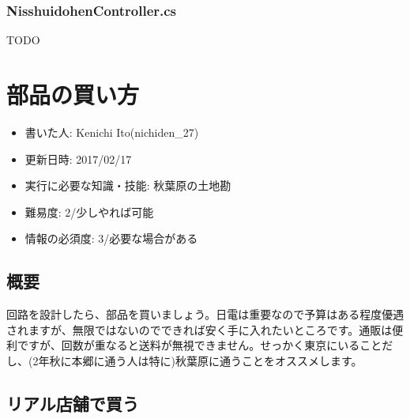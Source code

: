 \documentclass[letterpaper,10pt,dvipdfmx]{sphinxmanual}
\begin{document}
\subsection{NisshuidohenController.cs}
\label{\detokenize{nissyu-idohen/pc-software-code:nisshuidohencontroller-cs}}
TODO


\chapter{部品の買い方}
\label{\detokenize{buy_parts:}}\label{\detokenize{buy_parts::doc}}\label{\detokenize{buy_parts:id1}}\begin{itemize}
\item {} 
書いた人: Kenichi Ito(nichiden\_27)

\item {} 
更新日時: 2017/02/17

\item {} 
実行に必要な知識・技能: 秋葉原の土地勘

\item {} 
難易度: 2/少しやれば可能

\item {} 
情報の必須度: 3/必要な場合がある

\end{itemize}


\section{概要}
\label{\detokenize{buy_parts:}}\label{\detokenize{buy_parts:id2}}
回路を設計したら、部品を買いましょう。日電は重要なので予算はある程度優遇されますが、無限ではないのでできれば安く手に入れたいところです。通販は便利ですが、回数が重なると送料が無視できません。せっかく東京にいることだし、(2年秋に本郷に通う人は特に)秋葉原に通うことをオススメします。


\section{リアル店舗で買う}
\label{\detokenize{buy_parts:}}\label{\detokenize{buy_parts:id3}}
\end{document}
